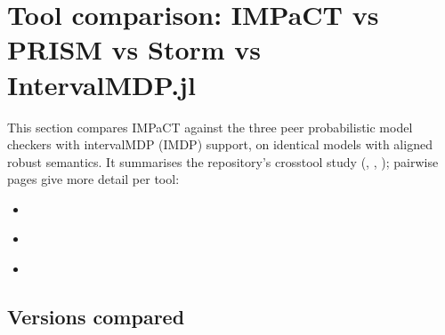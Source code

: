 \documentclass[a4paper,10pt,english]{sphinxmanual}
\begin{document}
\section{Tool comparison: IMPaCT vs PRISM vs Storm vs IntervalMDP.jl}
\label{\detokenize{comparison/index:tool-comparison-impact-vs-prism-vs-storm-vs-intervalmdp-jl}}\label{\detokenize{comparison/index::doc}}
\sphinxAtStartPar
This section compares IMPaCT against the three peer probabilistic model checkers with
interval\sphinxhyphen{}MDP (IMDP) support, on identical models with aligned robust semantics. It
summarises the repository’s cross\sphinxhyphen{}tool study (, ,
); pairwise pages give more detail per tool:
\begin{itemize}
\item {} 
\sphinxAtStartPar
{\hyperref[\detokenize{comparison/impact-vs-prism::doc}]{}}

\item {} 
\sphinxAtStartPar
{\hyperref[\detokenize{comparison/impact-vs-storm::doc}]{}}

\item {} 
\sphinxAtStartPar
{\hyperref[\detokenize{comparison/impact-vs-intervalmdp::doc}]{}}

\end{itemize}


\subsection{Versions compared}
\label{\detokenize{comparison/index:versions-compared}}
\end{document}
